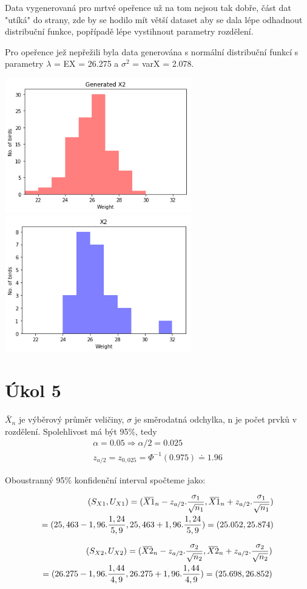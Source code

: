 \documentclass[12pt,a4paper]{article}
\newcommand{\overbar}[1]{\mkern 2.5mu\overline{\mkern-2.5mu#1\mkern-2.5mu}\mkern 2.5mu}
\begin{document}
Data vygenerovaná pro mrtvé opeřence už na tom nejsou tak dobře, část dat "utíká" do strany, zde by se hodilo mít větší dataset aby se dala lépe odhadnout distribuční funkce, popřípadě lépe vystihnout parametry rozdělení.

Pro opeřence jež nepřežili byla data generována s normální distribuční funkcí s parametry $\lambda$ = EX = 26.275 a $\sigma ^2$ = varX = 2.078.

\includegraphics[width=3.2in]{4_Died_Gen}
\includegraphics[width=3.2in]{4_Died_Data}

\par \bigskip

\section{Úkol 5}

$\bar{X}_n$ je výběrový průměr veličiny, $\sigma$ je směrodatná odchylka, n je počet prvků v rozdělení. Spolehlivost má být 95\%, tedy 
\begin{align*}
\alpha = 0.05 \Rightarrow \alpha/2 = 0.025 \\
z_{a/2} = z_{0,025} = \Phi^{-1}(0.975) \doteq 1.96
\end{align*}

Oboustranný 95\% konfidenční interval spočteme jako:

\begin{align}
(S_{X1},U_{X1}) = (\overbar{X1}_n - z_{a/2}.\frac{\sigma_1}{\sqrt{n_1}}, \overbar{X1}_n + z_{a/2}.\frac{\sigma_1}{\sqrt{n_1}}) \nonumber\\
= (25,463 - 1,96.\frac{1,24}{5,9}, 25,463 + 1,96.\frac{1,24}{5,9}) = (25.052, 25.874)
\end{align}

\begin{align}
(S_{X2},U_{X2}) = (\overbar{X2}_n - z_{a/2}.\frac{\sigma_2}{\sqrt{n_2}}, \overbar{X2}_n + z_{a/2}.\frac{\sigma_2}{\sqrt{n_2}}) \nonumber\\
= (26.275 - 1,96.\frac{1,44}{4,9}, 26.275 + 1,96.\frac{1,44}{4,9}) = (25.698, 26.852)
\end{align}
\end{document}
